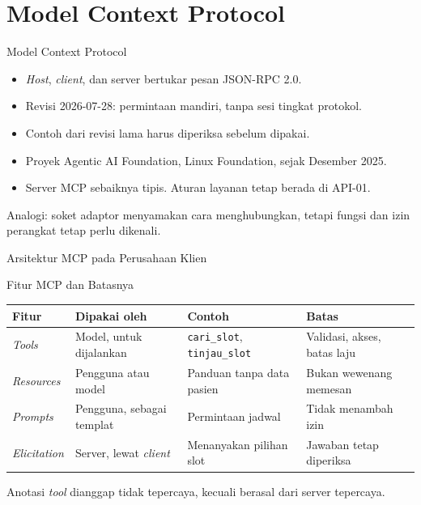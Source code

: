\documentclass[aspectratio=169, table, 12pt]{beamer}
\begin{document}
\section{Model Context Protocol}

\begin{frame}{{\Large Model Context Protocol}}
  \vspace{8pt}
  \begin{itemize}
    \item \textit{Host}, \textit{client}, dan server bertukar pesan JSON-RPC 2.0.
    \item Revisi 2026-07-28: permintaan mandiri, tanpa sesi tingkat protokol.
    \item Contoh dari revisi lama harus diperiksa sebelum dipakai.
    \item Proyek Agentic AI Foundation, Linux Foundation, sejak Desember 2025.
    \item Server MCP sebaiknya tipis. Aturan layanan tetap berada di API-01.
  \end{itemize}
  \vspace{6pt}
  {\small Analogi: soket adaptor menyamakan cara menghubungkan, tetapi fungsi dan izin perangkat tetap perlu dikenali.}
\end{frame}

\begin{frame}{{\Large Arsitektur MCP pada Perusahaan Klien}}
  \centering
\end{frame}

\begin{frame}{{\Large Fitur MCP dan Batasnya}}
  \footnotesize
  \begin{tabularx}{\textwidth}{>{\raggedright\arraybackslash}p{2.0cm} >{\raggedright\arraybackslash}p{3.0cm} >{\raggedright\arraybackslash}X >{\raggedright\arraybackslash}X}
    \hline
    \textbf{Fitur} & \textbf{Dipakai oleh} & \textbf{Contoh} & \textbf{Batas} \\ \hline
    \textit{Tools} & Model, untuk dijalankan & \texttt{cari\_slot}, \texttt{tinjau\_slot} & Validasi, akses, batas laju \\ \hline
    \textit{Resources} & Pengguna atau model & Panduan tanpa data pasien & Bukan wewenang memesan \\ \hline
    \textit{Prompts} & Pengguna, sebagai templat & Permintaan jadwal & Tidak menambah izin \\ \hline
    \textit{Elicitation} & Server, lewat \textit{client} & Menanyakan pilihan slot & Jawaban tetap diperiksa \\ \hline
  \end{tabularx}

  \vspace{8pt}
  \small Anotasi \textit{tool} dianggap tidak tepercaya, kecuali berasal dari server tepercaya.
\end{frame}
\end{document}
